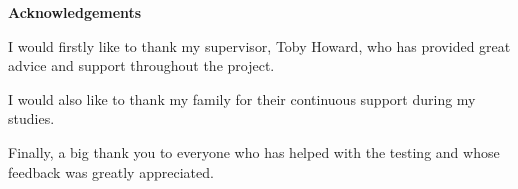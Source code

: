 \vspace*{\fill}

\begin{center}
    \textbf{Acknowledgements}   
\end{center}

I would firstly like to thank my supervisor, Toby Howard, who has provided great advice and support throughout the project. 

I would also like to thank my family for their continuous support during my studies.

Finally, a big thank you to everyone who has helped with the testing and whose feedback was greatly appreciated.

\vspace*{\fill}